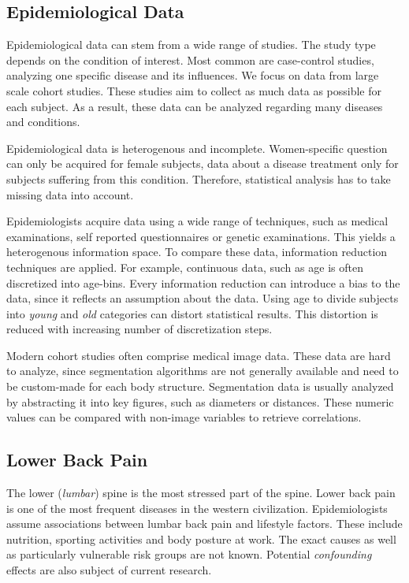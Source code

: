 \documentclass[a4paper,twoside]{style/article}
\begin{document}
\subsection{Epidemiological Data}
Epidemiological data can stem from a wide range of studies.
The study type depends on the condition of interest.
Most common are case-control studies, analyzing one specific disease and its influences.
We focus on data from large scale cohort studies.
These studies aim to collect as much data as possible for each subject.
As a result, these data can be analyzed regarding many diseases and conditions.

Epidemiological data is heterogenous and incomplete.
Women-specific question can only be acquired for female subjects, data about a disease treatment only for subjects suffering from this condition.
Therefore, statistical analysis has to take missing data into account.

Epidemiologists acquire data using a wide range of techniques, such as medical examinations, self reported questionnaires or genetic examinations.
This yields a heterogenous information space.
To compare these data, information reduction techniques are applied.
For example, continuous data, such as age is often discretized into age-bins.
Every information reduction can introduce a bias to the data, since it reflects an assumption about the data.
Using age to divide subjects into \emph{young} and \emph{old} categories can distort statistical results.
This distortion is reduced with increasing number of discretization steps.

Modern cohort studies often comprise medical image data.
These data are hard to analyze, since segmentation algorithms are not generally available and need to be custom-made for each body structure.
Segmentation data is usually analyzed by abstracting it into key figures, such as diameters or distances.
These numeric values can be compared with non-image variables to retrieve correlations.
\subsection{Lower Back Pain}
The lower (\emph{lumbar}) spine is the most stressed part of the spine.
Lower back pain is one of the most frequent diseases in the western civilization.
Epidemiologists assume associations between lumbar back pain and lifestyle factors.
These include nutrition, sporting activities and body posture at work.
The exact causes as well as particularly vulnerable risk groups are not known.
Potential \emph{confounding} effects are also subject of current research.
\end{document}
